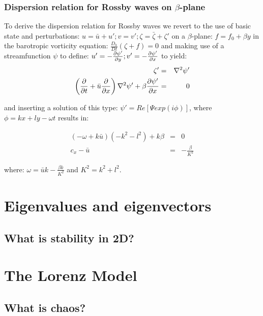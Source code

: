 \subsection{Dispersion relation for Rossby waves on $\beta$-plane}

To derive the dispersion relation for Rossby waves we revert to the use of basic state and perturbations: $u=\bar{u}+u'; v=v'; \zeta = \bar{\zeta}+\zeta'$ on a $\beta$-plane: $f=f_0+\beta y$ in the barotropic vorticity equation: $\frac{D_h}{Dt}\left({\zeta+f} \right)=0$
and making use of a streamfunction $\psi$ to define: $u'=-\frac{\partial \psi'}{\partial y}; v'=-\frac{\partial \psi'}{\partial x}$ to yield:
\begin{eqnarray}
	\zeta'&=&\nabla^2\psi'\\
	\left(\frac{\partial }{\partial t}+\bar{u}\frac{\partial }{\partial x}\right)\nabla^2\psi'+\beta \frac{\partial \psi'}{\partial x}&=&0
\end{eqnarray}

and inserting a solution of this type: $\psi'=Re[\Psi exp(i\phi)]$, where $\phi=kx+ly-\omega t$ results in:

\begin{eqnarray}
	(-\omega + k\bar{u})(-k^2-l^2)+k \beta & = & 0\\
	c_x-\bar{u} & = & -\frac{\beta}{K^2}
\end{eqnarray}

where: $\omega=\bar{u}k-\frac{\beta k}{K^2}$ and $K^2=k^2+l^2$.\\


\vspace{1em} 


\newpage
\chapter{Eigenvalues and eigenvectors}

\section{What is stability in 2D?}

\vspace{1em} 

\newpage
\chapter{The Lorenz Model}

\section{What is chaos?}

